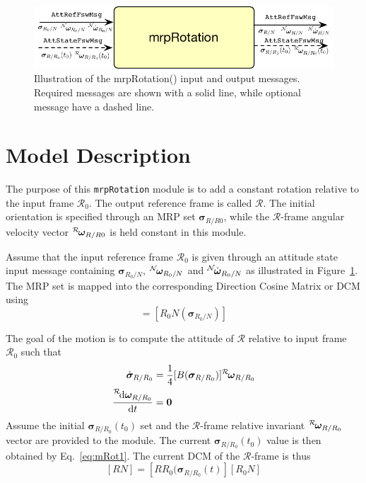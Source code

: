 

\begin{figure}[htb]
	\centerline{
	\includegraphics[]{Figures/moduleIO}
	}
	\caption{Illustration of the mrpRotation() input and output messages.  Required messages are shown with a solid line, while optional message have a dashed line.}
	\label{fig:moduleIO}
\end{figure}

\section{Model Description}
The purpose of this {\tt mrpRotation} module is to add a constant rotation relative to the input frame $\mathcal{R}_{0}$.  The output reference frame is called $\mathcal{R}$.  The initial orientation is specified through an MRP\cite{schaub} set $\bm\sigma_{R/R0}$, while the  $\mathcal{R}$-frame angular velocity vector $\leftexp{R}{\bm\omega}_{R/R0}$ is held constant in this module.  

Assume that the input reference frame $\mathcal{R}_{0}$ is given through an attitude state input message containing $\bm\sigma_{R_{0}/N}$, $\leftexp{N}{\bm\omega}_{R_{0}/N}$ and $\leftexp{N}{\dot{\bm\omega}}_{R_{0}/N}$ as illustrated in Figure~\ref{fig:moduleIO}.  The MRP set is mapped into the corresponding Direction Cosine Matrix or DCM\cite{schaub} using
\begin{equation}
	[R_{0}N] = [R_{0}N ( \bm\sigma_{R_{0}/N})]
\end{equation}


The goal of the motion is to compute the attitude of $\mathcal{R}$ relative to input frame $\mathcal{R}_{0}$ such that
\begin{align}
	\label{eq:mRot1}
	\dot{\bm\sigma}_{R/R_{0}} &= \frac{1}{4} [B(\bm\sigma_{R/R_{0}})] \leftexp{R}{\bm\omega}_{R/R_{0}}
	\\
	\label{eq:mRot2}
	\frac{\leftexp{R}{\D} {\bm\omega}_{R/R_{0}}}{\D t} &= \bm 0
\end{align}
Assume the initial $\bm\sigma_{R/R_{0}}(t_{0})$ set and the $\mathcal{R}$-frame relative invariant $\leftexp{R}{\bm\omega}_{R/R_{0}}$ vector are provided to the module.  The current $\bm\sigma_{R/R_{0}}(t_{0})$ value is then obtained by Eq.~\eqref{eq:mRot1}.  The current DCM of the $\mathcal{R}$-frame is thus
\begin{equation}
	\label{eq:mRot3}
	[RN] = [RR_{0}(\bm\sigma_{R/R_{0}}(t) ] [R_{0}N]
\end{equation}

